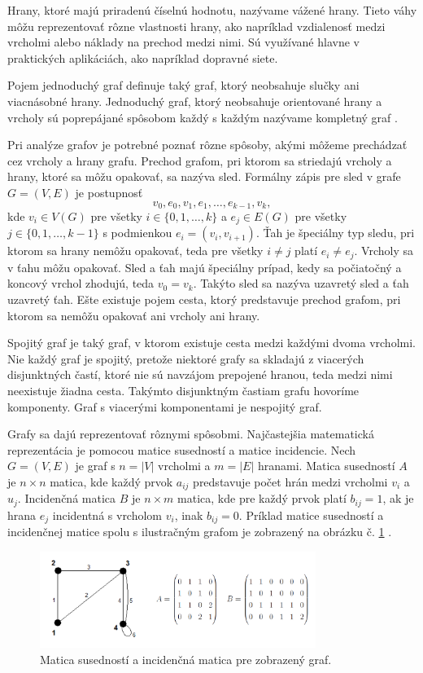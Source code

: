 Hrany, ktoré majú priradenú číselnú hodnotu, nazývame vážené hrany. Tieto váhy môžu reprezentovať rôzne vlastnosti hrany, 
ako napríklad vzdialenosť medzi vrcholmi alebo náklady na prechod medzi nimi. Sú využívané hlavne v praktických aplikáciách,
ako napríklad dopravné siete.

Pojem jednoduchý graf definuje taký graf, ktorý neobsahuje slučky ani viacnásobné hrany. Jednoduchý graf, ktorý neobsahuje 
orientované hrany a vrcholy sú poprepájané spôsobom každý s každým nazývame kompletný graf \cite{markovsovadynamika} .

Pri analýze grafov je potrebné poznať rôzne spôsoby, akými môžeme prechádzať cez vrcholy a hrany grafu.
Prechod grafom, pri ktorom sa striedajú vrcholy a hrany, ktoré sa môžu opakovať, sa nazýva sled.
Formálny zápis pre sled v grafe $G = (V, E)$ je postupnosť 
\[
v_0, e_0, v_1, e_1, \dots, e_{k-1}, v_{k},
\]
kde $v_i \in V(G)$ pre všetky $i \in \{0, 1, \dots, k\}$ a $e_j \in E(G)$ pre všetky $j \in \{0, 1, \dots, k-1\}$ s podmienkou
$e_i = (v_i, v_{i+1})$. Ťah je špeciálny typ sledu, pri ktorom sa hrany nemôžu opakovať, teda pre všetky $i \neq j$ platí $e_i \neq e_j$.
Vrcholy sa v ťahu môžu opakovať. Sled a ťah majú špeciálny prípad, kedy sa počiatočný a koncový vrchol zhodujú, teda $v_0 = v_k$.
Takýto sled sa nazýva uzavretý sled a ťah uzavretý ťah. Ešte existuje pojem cesta, ktorý predstavuje prechod grafom, pri ktorom sa
nemôžu opakovať ani vrcholy ani hrany.

Spojitý graf je taký graf, v ktorom existuje cesta medzi každými dvoma vrcholmi. Nie každý graf je spojitý, pretože niektoré grafy sa
skladajú z viacerých disjunktných častí, ktoré nie sú navzájom prepojené hranou, teda medzi nimi neexistuje žiadna cesta. Takýmto
disjunktným častiam grafu hovoríme komponenty. Graf s viacerými komponentami je nespojitý graf.

Grafy sa dajú reprezentovať rôznymi spôsobmi. Najčastejšia matematická reprezentácia je pomocou matice susedností a matice incidencie.
Nech $G = (V, E)$ je graf s $n = |V|$ vrcholmi a $m = |E|$ hranami. Matica susedností $A$ je $n \times n$ matica, kde každý prvok $a_{ij}$
predstavuje počet hrán medzi vrcholmi $v_i$ a $u_j$. Incidenčná matica $B$ je $n \times m$ matica, kde pre každý prvok platí $b_{ij} = 1$,
ak je hrana $e_j$ incidentná s vrcholom $v_i$, inak $b_{ij} = 0$.
Príklad matice susedností a incidenčnej matice spolu s ilustračným grafom je zobrazený na obrázku č. \ref{obr:matrices} .

\begin{figure}
    \centerline{\includegraphics[width=0.8\textwidth]{images/matrices.png}}
    \caption[Matica susedností a incidenčná matica.]{Matica susedností a incidenčná matica pre zobrazený graf.}
    \label{obr:matrices}
\end{figure}


